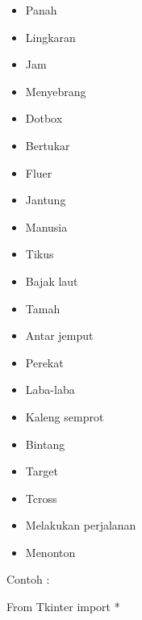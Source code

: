 \documentclass [12pt,a4paper,notitlepage,oneside,bahasa]{article}
\begin{document}
\begin{itemize}
\item Panah \par
\noindent 
\item Lingkaran \par
\noindent 
\item Jam \par
\noindent 
\item Menyebrang \par
\noindent 
\item Dotbox \par
\noindent 
\item Bertukar \par
\noindent 
\item Fluer \par
\noindent 
\item Jantung \par
\noindent 
\item Manusia \par
\noindent 
\item Tikus \par
\noindent 
\item Bajak laut \par
\noindent 
\item Tamah \par
\noindent 
\item Antar jemput \par
\noindent 
\item Perekat \par
\noindent 
\item Laba-laba \par
\noindent 
\item Kaleng semprot \par
\noindent 
\item Bintang \par
\noindent 
\item Target \par
\noindent 
\item Tcross \par
\noindent 
\item Melakukan perjalanan \par
\noindent 
\item Menonton\end{itemize}
 \par
\vspace{12pt}
Contoh : \par
{\fontsize{10pt}{10pt}\selectfont From Tkinter import *} \par
\end{document}
